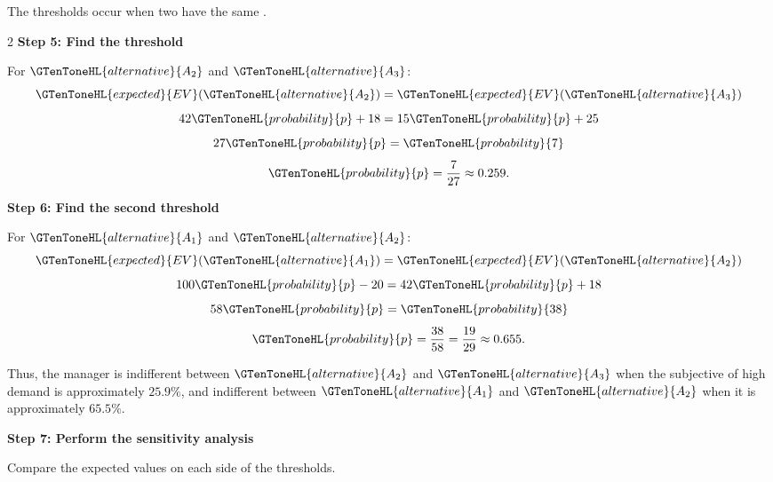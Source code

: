 	The thresholds occur when two  have the same  .
	
	\noindent
	\setlength{\columnseprule}{0.4pt}
	\begin{multicols}{2}
		\textbf{Step 5: Find the threshold }
		
		For $\GTenToneHL{alternative}{A_2}$ and $\GTenToneHL{alternative}{A_3}$:
		\[
		\GTenToneHL{expected}{EV}(\GTenToneHL{alternative}{A_2})=\GTenToneHL{expected}{EV}(\GTenToneHL{alternative}{A_3})
		\]
		\[
		42\GTenToneHL{probability}{p}+18=15\GTenToneHL{probability}{p}+25
		\]
		\[
		27\GTenToneHL{probability}{p}=\GTenToneHL{probability}{7}
		\]
		\[
		\GTenToneHL{probability}{p}=\frac{7}{27}
		\approx0.259.
		\]
		
		\columnbreak
		
		\textbf{Step 6: Find the second threshold }
		
		For $\GTenToneHL{alternative}{A_1}$ and $\GTenToneHL{alternative}{A_2}$:
		\[
		\GTenToneHL{expected}{EV}(\GTenToneHL{alternative}{A_1})=\GTenToneHL{expected}{EV}(\GTenToneHL{alternative}{A_2})
		\]
		\[
		100\GTenToneHL{probability}{p}-20=42\GTenToneHL{probability}{p}+18
		\]
		\[
		58\GTenToneHL{probability}{p}=\GTenToneHL{probability}{38}
		\]
		\[
		\GTenToneHL{probability}{p}=\frac{38}{58}
		=\frac{19}{29}
		\approx0.655.
		\]
		
	\end{multicols}
	
	Thus, the manager is indifferent between $\GTenToneHL{alternative}{A_2}$ and $\GTenToneHL{alternative}{A_3}$ when the
	subjective  of high demand is approximately $25.9\%$,
	and indifferent between $\GTenToneHL{alternative}{A_1}$ and $\GTenToneHL{alternative}{A_2}$ when it is approximately
	$65.5\%$.
	
	\textbf{Step 7: Perform the sensitivity analysis}
	
	Compare the expected values on each side of the thresholds.
	
